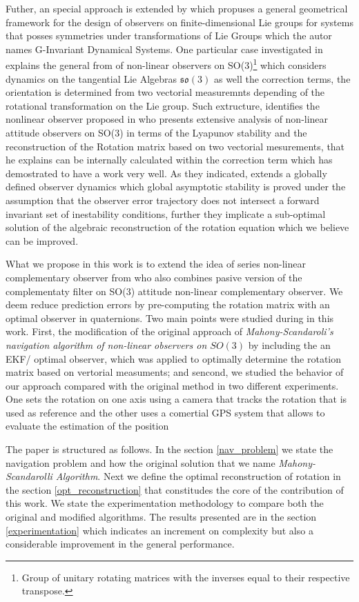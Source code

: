 \documentclass[conference]{IEEEtran}
\begin{document}
Futher, an special approach is extended by \cite{Bonabel2008} which propuses a general geometrical framework for the design of observers on finite-dimensional Lie groups for systems that posses symmetries under transformations of Lie Groups which the autor names G-Invariant Dynamical Systems. One particular case investigated in \cite{Bonabel2005} explains the general from of non-linear observers on SO(3)\footnote{Group of unitary rotating matrices with the inverses equal to their respective transpose.} which considers dynamics on the tangential Lie Algebras $\mathfrak{so}(3)$ as well the correction terms, the orientation is determined from two vectorial measuremnts depending of the rotational transformation on the Lie group. Such extructure, identifies the nonlinear observer proposed in \cite{Mahony2008} who presents extensive analysis of non-linear attitude observers on SO(3) in terms of the Lyapunov stability and the reconstruction of the Rotation matrix based on two vectorial mesurements, that he explains can be internally calculated within the correction term which has demostrated to have a work very well. As they indicated, \cite{Mahony2008} extends a globally defined observer dynamics which global asymptotic stability is proved under the assumption that the observer error trajectory does not intersect a forward invariant set of inestability conditions, further they implicate a sub-optimal solution of the algebraic reconstruction of the rotation equation which we believe can be improved. 

What we propose in this work is to extend the idea of series non-linear complementary observer from \cite{Scandaro2011} who also combines pasive version of the complementaty filter on SO(3) \cite{Mahony2008} attitude non-linear complementary observer. We deem reduce prediction errors by pre-computing the rotation matrix with an optimal observer in quaternions. Two main points were studied during in this work. First, the modification of the original approach of \emph{Mahony-Scandaroli's navigation algorithm of non-linear observers on $SO(3)$} \cite{Mahony2008,Scandaro2011} by including the an EKF/ optimal observer, which was applied to optimally determine the rotation matrix based on vertorial measuments; and sencond, we studied the behavior of our approach compared with the original method in two different experiments. One sets the rotation on one axis using a camera that tracks the rotation that is used as reference and the other uses a comertial GPS system that allows to evaluate the estimation of the position\par
The paper is structured as follows. In the section \ref{nav_problem} we state the navigation problem and how the original solution that we name \emph{Mahony-Scandarolli Algorithm}. Next we define the optimal reconstruction of rotation in the section \ref{opt_reconstruction} that constitudes the core of the contribution of this work. We state the experimentation methodology to compare both the original and modified algorithms. The results presented are in the section \ref{experimentation} which indicates an increment on complexity but also a considerable improvement in the general performance. 
\end{document}
